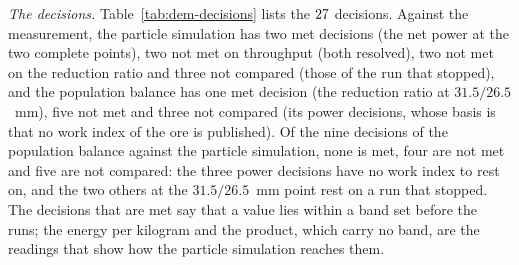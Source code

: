 \begin{table}[!t]
\centering
\caption{The laboratory-jaw evaluation of the population balance at the three operating points: the ore link, the energy and $t_{10}$, the factors of the capacity model of Sastri, the throughput, the analytic $F_{80}$, Bond's energy per unit of work index, the work index implied by the measured specific energy at the predicted and at the measured sizes, and the flags of the engine. Generated from \texttt{jaw-lab.json}.}
\label{tab:dem-pb}
\scriptsize

\end{table}

\emph{The decisions.} Table~\ref{tab:dem-decisions} lists the $27$ decisions. Against the measurement, the particle simulation has two met decisions (the net power at the two complete points), two not met on throughput (both resolved), two not met on the reduction ratio and three not compared (those of the run that stopped), and the population balance has one met decision (the reduction ratio at $31.5/26.5$~mm), five not met and three not compared (its power decisions, whose basis is that no work index of the ore is published). Of the nine decisions of the population balance against the particle simulation, none is met, four are not met and five are not compared: the three power decisions have no work index to rest on, and the two others at the $31.5/26.5$~mm point rest on a run that stopped. The decisions that are met say that a value lies within a band set before the runs; the energy per kilogram and the product, which carry no band, are the readings that show how the particle simulation reaches them.


